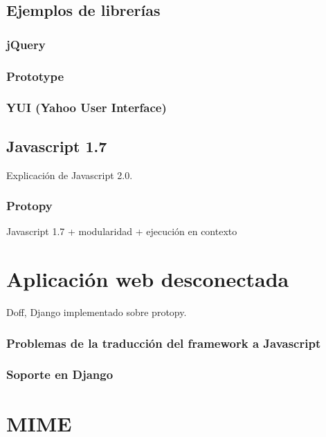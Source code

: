 \documentclass[a4paper]{report}
\begin{document}
\section{Ejemplos de librerías}
\subsection{jQuery}
\subsection{Prototype}
\subsection{YUI (Yahoo User Interface)}

\section{Javascript 1.7}
Explicación de Javascript 2.0.

\subsection{Protopy}
Javascript 1.7 + modularidad + ejecución en contexto

\chapter{Aplicación web desconectada}
Doff, Django implementado sobre protopy.
\subsection{Problemas de la traducción del framework a Javascript}
\subsection{Soporte en Django}


\appendix

\chapter{MIME}
\end{document}
